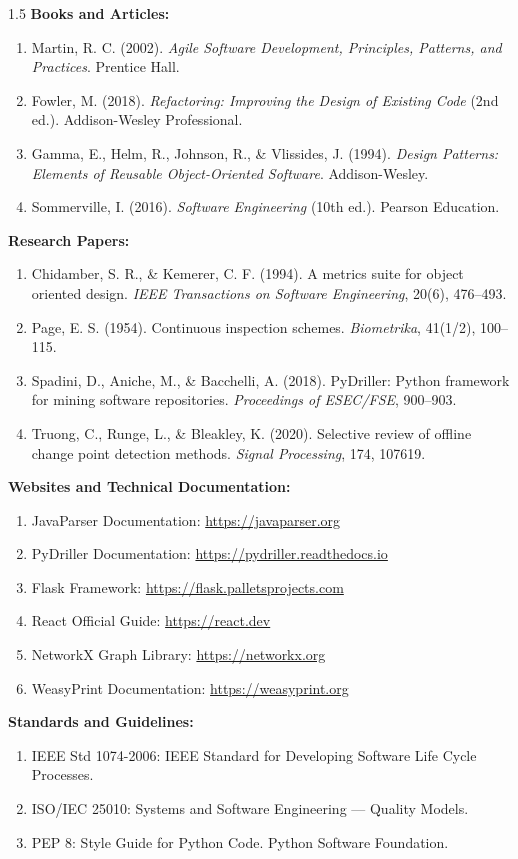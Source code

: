 \documentclass[12pt,a4paper]{article}
\begin{document}
\begin{spacing}{1.5}
\justifying
\textbf{Books and Articles:}
\begin{enumerate}[leftmargin=*,itemsep=2pt]
  \item Martin, R. C. (2002). \textit{Agile Software Development, Principles, Patterns, and Practices}. Prentice Hall.
  \item Fowler, M. (2018). \textit{Refactoring: Improving the Design of Existing Code} (2nd ed.). Addison-Wesley Professional.
  \item Gamma, E., Helm, R., Johnson, R., \& Vlissides, J. (1994). \textit{Design Patterns: Elements of Reusable Object-Oriented Software}. Addison-Wesley.
  \item Sommerville, I. (2016). \textit{Software Engineering} (10th ed.). Pearson Education.
\end{enumerate}

\textbf{Research Papers:}
\begin{enumerate}[leftmargin=*,itemsep=2pt]
  \item Chidamber, S. R., \& Kemerer, C. F. (1994). A metrics suite for object oriented design. \textit{IEEE Transactions on Software Engineering}, 20(6), 476--493.
  \item Page, E. S. (1954). Continuous inspection schemes. \textit{Biometrika}, 41(1/2), 100--115.
  \item Spadini, D., Aniche, M., \& Bacchelli, A. (2018). PyDriller: Python framework for mining software repositories. \textit{Proceedings of ESEC/FSE}, 900--903.
  \item Truong, C., Runge, L., \& Bleakley, K. (2020). Selective review of offline change point detection methods. \textit{Signal Processing}, 174, 107619.
\end{enumerate}

\textbf{Websites and Technical Documentation:}
\begin{enumerate}[leftmargin=*,itemsep=2pt]
  \item JavaParser Documentation: \url{https://javaparser.org}
  \item PyDriller Documentation: \url{https://pydriller.readthedocs.io}
  \item Flask Framework: \url{https://flask.palletsprojects.com}
  \item React Official Guide: \url{https://react.dev}
  \item NetworkX Graph Library: \url{https://networkx.org}
  \item WeasyPrint Documentation: \url{https://weasyprint.org}
\end{enumerate}

\textbf{Standards and Guidelines:}
\begin{enumerate}[leftmargin=*,itemsep=2pt]
  \item IEEE Std 1074-2006: IEEE Standard for Developing Software Life Cycle Processes.
  \item ISO/IEC 25010: Systems and Software Engineering --- Quality Models.
  \item PEP 8: Style Guide for Python Code. Python Software Foundation.
\end{enumerate}
\end{spacing}
\end{document}
